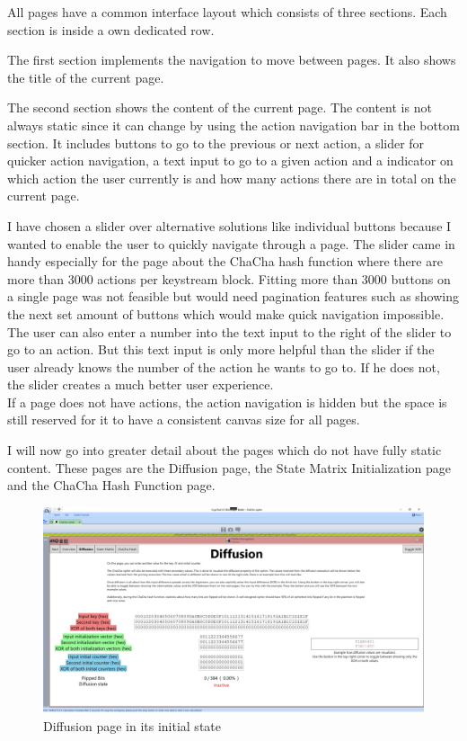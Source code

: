 All pages have a common interface layout which consists of three sections. Each section is inside a own dedicated row.

The first section implements the navigation to move between pages. It also shows the title of the current page.

The second section shows the content of the current page. The content is not always static since it can change by using the action navigation bar in the bottom section. It includes buttons to go to the previous or next action, a slider for quicker action navigation, a text input to go to a given action and a indicator on which action the user currently is and how many actions there are in total on the current page.

I have chosen a slider over alternative solutions like individual buttons because I wanted to enable the user to quickly navigate through a page. The slider came in handy especially for the page about the ChaCha hash function where there are more than 3000 actions per keystream block. Fitting more than 3000 buttons on a single page was not feasible but would need pagination features such as showing the next set amount of buttons which would make quick navigation impossible. \\
The user can also enter a  number into the text input to the right of the slider to go to an action. But this text input is only more helpful than the slider if the user already knows the number of the action he wants to go to. If he does not, the slider creates a much better user experience. \\
If a page does not have actions, the action navigation is hidden but the space is still reserved for it to have a consistent canvas size for all pages.

I will now go into greater detail about the pages which do not have fully static content. These pages are the Diffusion page, the State Matrix Initialization page and the ChaCha Hash Function page.

\begin{figure}
\centering
\includegraphics[width=\textwidth]{figures/ct2/all-pages/3-diffusion.png}
\caption{Diffusion page in its initial state}
\label{fig:diffusionpage}
\end{figure}

